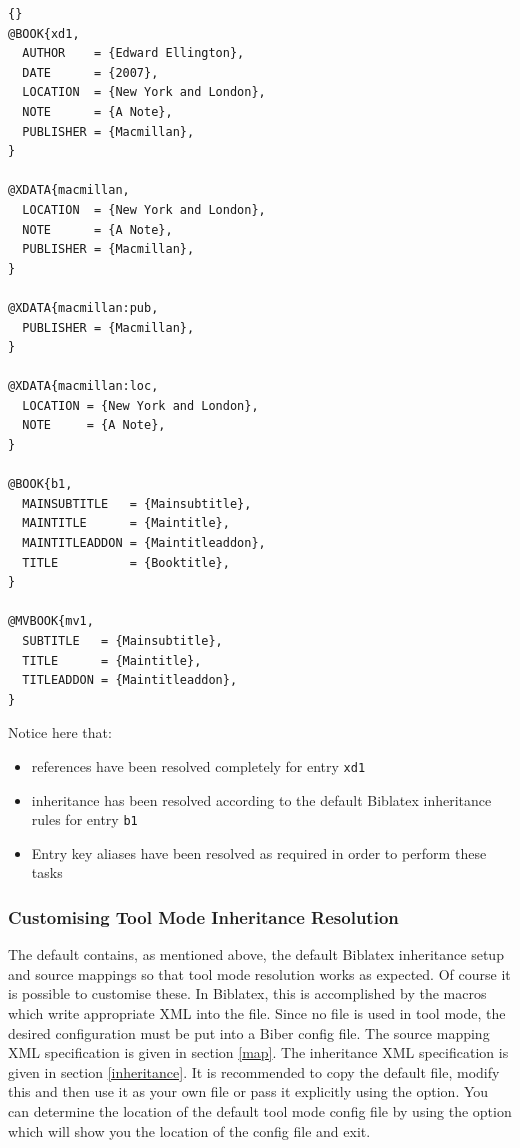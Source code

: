 \documentclass{ltxdockit}
\newcommand*{\biber}{Biber\xspace}
\newcommand*{\biblatex}{Biblatex\xspace}
\begin{document}
\begin{lstlisting}[style=bibtex, columns=fixed]{}
@BOOK{xd1,
  AUTHOR    = {Edward Ellington},
  DATE      = {2007},
  LOCATION  = {New York and London},
  NOTE      = {A Note},
  PUBLISHER = {Macmillan},
}

@XDATA{macmillan,
  LOCATION  = {New York and London},
  NOTE      = {A Note},
  PUBLISHER = {Macmillan},
}

@XDATA{macmillan:pub,
  PUBLISHER = {Macmillan},
}

@XDATA{macmillan:loc,
  LOCATION = {New York and London},
  NOTE     = {A Note},
}

@BOOK{b1,
  MAINSUBTITLE   = {Mainsubtitle},
  MAINTITLE      = {Maintitle},
  MAINTITLEADDON = {Maintitleaddon},
  TITLE          = {Booktitle},
}

@MVBOOK{mv1,
  SUBTITLE   = {Mainsubtitle},
  TITLE      = {Maintitle},
  TITLEADDON = {Maintitleaddon},
}
\end{lstlisting}
%
Notice here that:
\begin{itemize}
\item {} references have been resolved completely for entry
  \texttt{xd1}
\item {} inheritance has been resolved according to the
  default \biblatex inheritance rules for entry \texttt{b1}
\item Entry key aliases have been resolved as required in order to perform
  these tasks
\end{itemize}
\bigskip
\subsubsection{Customising Tool Mode Inheritance Resolution}
The default  contains, as mentioned above, the
default \biblatex {} inheritance setup and \bibtex source
mappings so that tool mode resolution works as expected. Of course it is
possible to customise these. In \biblatex, this is accomplished by the
 macros which write appropriate XML into the
 file. Since no  file is used in tool mode, the
desired configuration must be put into a \biber config file. The source
mapping XML specification is given in section \ref{map}. The inheritance
XML specification is given in section \ref{inheritance}. It is recommended
to copy the default  file, modify this and then use
it as your own  file or pass it explicitly using the
 option. You can determine the location of the default
tool mode config file by using the  option which will
show you the location of the config file and exit.
\bigskip
\end{document}
